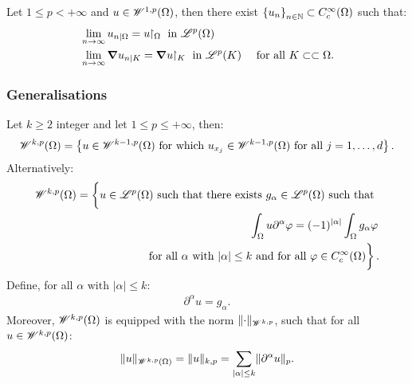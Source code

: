 \begin{theorem}
    Let $1 \leq p < +\infty$ and $u \in \mathscr{W}^{1, p}(\Omega)$, then there exist $\left\{ u_n \right\}_{n \in \mathbb{N}} \subset C_c^{\infty}(\Omega)$ such that:
    \begin{align}
        & \lim_{n \rightarrow \infty} u_{n \mid \Omega} = u \!\!\restriction_{\Omega} \text { in } \mathscr{L}^{p}(\Omega)\\
        & \lim_{n \rightarrow \infty} \bm{\nabla} u_{n \mid K} = \bm{\nabla} u \!\!\restriction_{K} \text { in } \mathscr{L}^{p}(K) &\text{ for all } K \subset \subset \Omega.
    \end{align}
\end{theorem}

\subsubsection{Generalisations}

\begin{definition}
    Let $k \geq 2$ integer and let $1 \leq p \leq +\infty$, then:
    \begin{align}
        \mathscr{W}^{k, p}(\Omega) = \left\{ u \in \mathscr{W}^{k - 1, p}(\Omega) \text{ for which } u_{x_j} \in \mathscr{W}^{k - 1, p}(\Omega) \text{ for all } j = 1, \dots, d \right\}.
    \end{align}
    Alternatively:
    \begin{align} %
        \SpaceWkp{k}{p}(\Omega) = \left\{ \vphantom{\int_{\Omega}} u \in \SpaceLp{p}(\Omega) \text{ such that there exists } g_{\alpha} \in \SpaceLp{p}(\Omega) \text{ such that } \right. \notag \\ 
        \left. \int_{\Omega} u \partial^{\alpha} \varphi = (-1)^{\lvert \alpha \rvert} \int_{\Omega} g_{\alpha} \varphi \right. \notag \\
        \left. \text{ for all } \alpha \text{ with } \lvert \alpha \rvert \leq k \text{ and for all }\varphi \in C_c^{\infty}(\Omega) \vphantom{\int_{\Omega}} \right\}.
    \end{align}
    Define, for all $\alpha \text{ with } \lvert \alpha \rvert \leq k$:
    \begin{align}
        \partial^{\alpha} u = g_{\alpha}.
    \end{align}
    Moreover, $\mathscr{W}^{k, p}(\Omega)$ is equipped with the norm $\lVert \cdot \rVert_{\mathscr{W}^{k, p}}$, such that for all $u \in \mathscr{W}^{k, p}(\Omega)$:
    \begin{align}
        \lVert u \rVert_{\mathscr{W}^{k, p}(\Omega)} = \lVert u \rVert_{k, p} = \sum_{\lvert \alpha \rvert \leq k} \lVert \partial^{\alpha} u \rVert_p.
    \end{align}
\end{definition}

